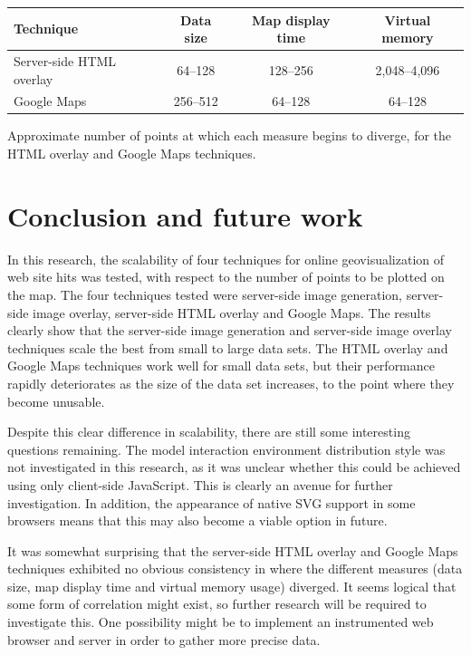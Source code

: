 \documentclass[acmnow]{acmtrans2m}
\begin{document}
\begin{acmtable}{11cm}
	\centering
	\begin{tabular}{lccc}
		Technique						&	Data size	&	Map display time	&	Virtual memory	\\
		\hline
		Server-side HTML overlay		&	64--128		&	128--256			&	2,048--4,096 \\
		Google Maps						&	256--512	&	64--128				&	64--128	\\
	\end{tabular}
	\caption{Approximate number of points at which each measure begins to diverge,
		for the HTML overlay and Google Maps techniques.}
	\label{tab-divergence}
\end{acmtable}


\section{Conclusion and future work}
\label{sec-conclusion}

In this research, the scalability of four techniques for
online geovisualization of web site hits was tested, with respect to the number of
points to be plotted on the map. The four techniques tested were
server-side image generation, server-side image overlay, server-side
HTML overlay and Google Maps. The results clearly show that the
server-side image generation and server-side image overlay techniques
scale the best from small to large data sets. The HTML overlay and
Google Maps techniques work well for small data sets, but their
performance rapidly deteriorates as the size of the data set increases,
to the point where they become unusable.

Despite this clear difference in scalability, there are still some
interesting questions remaining. The model interaction environment
distribution style was not investigated in this research, as it was
unclear whether this could be achieved using only client-side
JavaScript. This is clearly an avenue for further investigation. In
addition, the appearance of native SVG support in some browsers means
that this may also become a viable option in future.

It was somewhat surprising that the server-side HTML overlay and Google
Maps techniques exhibited no obvious consistency in where the different
measures (data size, map display time and virtual memory usage)
diverged. It seems logical that some form of correlation might exist, so
further research will be required to investigate this. One possibility
might be to implement an instrumented web browser and server in order to
gather more precise data.
\end{document}
